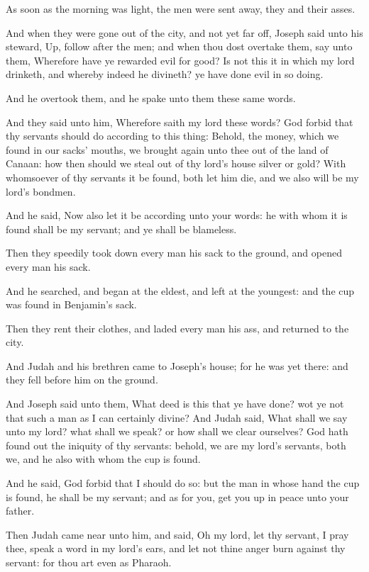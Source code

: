 \verse As soon as the morning was light, the men were sent away, they and their asses.

\verse And when they were gone out of the city, and not yet far off, Joseph said unto his steward, Up, follow after the men; and when thou dost overtake them, say unto them, Wherefore have ye rewarded evil for good?  \verse Is not this it in which my lord drinketh, and whereby indeed he divineth? ye have done evil in so doing.

\verse And he overtook them, and he spake unto them these same words.

\verse And they said unto him, Wherefore saith my lord these words? God forbid that thy servants should do according to this thing: \verse Behold, the money, which we found in our sacks' mouths, we brought again unto thee out of the land of Canaan: how then should we steal out of thy lord's house silver or gold?  \verse With whomsoever of thy servants it be found, both let him die, and we also will be my lord's bondmen.

\verse And he said, Now also let it be according unto your words: he with whom it is found shall be my servant; and ye shall be blameless.

\verse Then they speedily took down every man his sack to the ground, and opened every man his sack.

\verse And he searched, and began at the eldest, and left at the youngest: and the cup was found in Benjamin's sack.

\verse Then they rent their clothes, and laded every man his ass, and returned to the city.

\verse And Judah and his brethren came to Joseph's house; for he was yet there: and they fell before him on the ground.

\verse And Joseph said unto them, What deed is this that ye have done?  wot ye not that such a man as I can certainly divine?  \verse And Judah said, What shall we say unto my lord? what shall we speak?  or how shall we clear ourselves? God hath found out the iniquity of thy servants: behold, we are my lord's servants, both we, and he also with whom the cup is found.

\verse And he said, God forbid that I should do so: but the man in whose hand the cup is found, he shall be my servant; and as for you, get you up in peace unto your father.

\verse Then Judah came near unto him, and said, Oh my lord, let thy servant, I pray thee, speak a word in my lord's ears, and let not thine anger burn against thy servant: for thou art even as Pharaoh.

